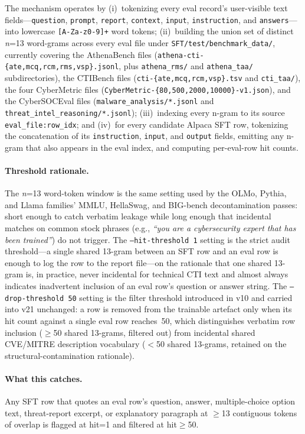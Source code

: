 \documentclass[webpdf,contemporary,large]{oup-authoring-template}
\theoremstyle{thmstyleone}
\theoremstyle{thmstyletwo}
\theoremstyle{thmstylethree}
\begin{document}
The mechanism operates by (i)~tokenizing every eval record's user-visible text fields---\texttt{question}, \texttt{prompt}, \texttt{report}, \texttt{context}, \texttt{input}, \texttt{instruction}, and \texttt{answers}---into lowercase \texttt{[A-Za-z0-9]+} word tokens; (ii)~building the union set of distinct \emph{n}=13 word-grams across every eval file under \texttt{SFT/test/benchmark\_data/}, currently covering the AthenaBench files (\texttt{athena-cti-\{ate,mcq,rcm,rms,vsp\}.jsonl}, plus \texttt{athena\_rms/} and \texttt{athena\_taa/} subdirectories), the CTIBench files (\texttt{cti-\{ate,mcq,rcm,vsp\}.tsv} and \texttt{cti\_taa/}), the four CyberMetric files (\texttt{CyberMetric-\{80,500,2000,10000\}-v1.json}), and the CyberSOCEval files (\texttt{malware\_analysis/*.jsonl} and \texttt{threat\_intel\_reasoning/*.jsonl}); (iii)~indexing every n-gram to its source \texttt{eval\_file:row\_idx}; and (iv)~for every candidate Alpaca SFT row, tokenizing the concatenation of its \texttt{instruction}, \texttt{input}, and \texttt{output} fields, emitting any n-gram that also appears in the eval index, and computing per-eval-row hit counts.

\paragraph{Threshold rationale.}
The \emph{n}=13 word-token window is the same setting used by the OLMo, Pythia, and Llama families' MMLU, HellaSwag, and BIG-bench decontamination passes: short enough to catch verbatim leakage while long enough that incidental matches on common stock phrases (e.g., \emph{``you are a cybersecurity expert that has been trained''}) do not trigger. The \texttt{--hit-threshold 1} setting is the strict audit threshold---a single shared 13-gram between an SFT row and an eval row is enough to log the row to the report file---on the rationale that one shared 13-gram is, in practice, never incidental for technical CTI text and almost always indicates inadvertent inclusion of an eval row's question or answer string. The \texttt{--drop-threshold 50} setting is the filter threshold introduced in v10 and carried into v21 unchanged: a row is removed from the trainable artefact only when its hit count against a single eval row reaches~50, which distinguishes verbatim row inclusion ($\geq$50 shared 13-grams, filtered out) from incidental shared CVE/MITRE description vocabulary ($<$50 shared 13-grams, retained on the structural-contamination rationale).

\paragraph{What this catches.}
Any SFT row that quotes an eval row's question, answer, multiple-choice option text, threat-report excerpt, or explanatory paragraph at $\geq$13 contiguous tokens of overlap is flagged at hit=1 and filtered at hit$\geq$50.
\end{document}
